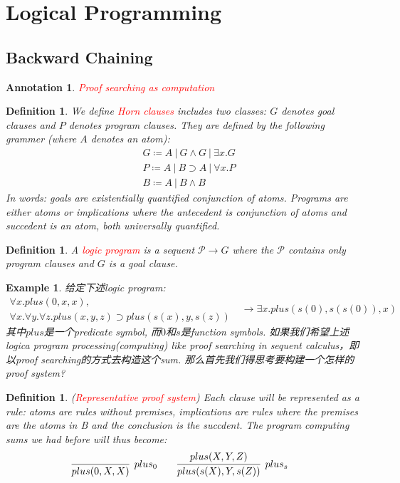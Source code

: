 \documentclass{article}
\theoremstyle{plain}
\newtheorem{example}[theorem]{Example}
\newtheorem{definition}[theorem]{Definition}
\newtheorem{annotation}[theorem]{Annotation}
\theoremstyle{nonumberplain}
\newcommand{\redt}[1]{\textcolor{red}{#1}}
\begin{document}
 
\newpage
\section{Logical Programming}

\subsection{Backward Chaining}

\begin{annotation}
\rm \redt{Proof searching as computation}
\end{annotation}

\begin{definition}
\rm We define \redt{Horn clauses} includes two classes: $G$ denotes goal clauses and $P$ denotes program clauses. They are defined by the following grammer (where $A$ denotes an atom):
$$
\begin{aligned}
&G \coloneqq A~|~ G \wedge G~|~ \exists x.G \\
&P \coloneqq A~|~ B \supset A~|~ \forall x.P \\
&B \coloneqq A~|~ B \wedge B 
\end{aligned}
$$
In words: goals are existentially quantified conjunction of atoms. Programs are either atoms or implications where the antecedent is conjunction of atoms and succedent is an atom, both universally quantified. 
\end{definition}

\begin{definition}
\rm A \redt{logic program} is a sequent $\mathcal{P} \to G$ where the $\mathcal{P}$ contains only program clauses and $G$ is a goal clause.
\end{definition}

\begin{example}\label{logic-pro-ex1}
\rm 给定下述logic program:
$$
\begin{gathered}
\forall x.plus(0,x,x), \\
\forall x. \forall y. \forall z. plus(x,y,z) \supset plus(s(x),y,s(z))
\end{gathered} ~~~\to
\exists x.plus(s(0),s(s(0)),x) 
$$
其中$plus$是一个predicate symbol, 而$0$和$s$是function symbols. 如果我们希望上述logica program processing(computing) like proof searching in sequent calculus，即以proof searching的方式去构造这个sum. 那么首先我们得思考要构建一个怎样的proof system? 
\end{example}

\begin{definition}
\rm (\redt{Representative proof system}) Each clause will be  represented as a rule: atoms are rules  without premises, implications are rules where the premises are the atoms in B and the conclusion is the succdent. The program computing sums we had before will thus become:
$$
\begin{aligned}
\infer[plus_0]{plus(0,X,X)}{} &&&&& \infer[plus_s]{plus(s(X),Y,s(Z))}{plus(X,Y,Z)}
\end{aligned}
$$ 
\end{definition}
\end{document}
